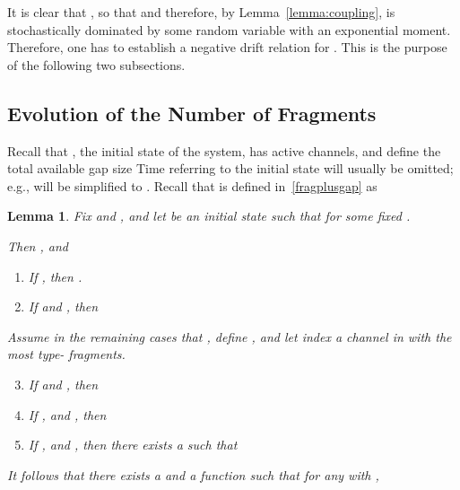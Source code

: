 \documentclass{amsart}
\newtheorem{lemma}{Lemma}
\begin{document}
It is clear that , so
that  and therefore, by Lemma~\ref{lemma:coupling},
 is stochastically dominated
by some random variable  with an exponential moment. Therefore,
one has to establish a negative drift relation for
. This is the purpose of
the following two subsections.
\subsection*{Evolution of the Number of Fragments}
Recall that  , the initial state of
the system, has  active channels, and define the total available gap size
  Time  referring to
the initial state   will usually be omitted; e.g.,  will be  simplified to .
Recall  that  is defined in~\eqref{fragplusgap} as 
\begin{lemma} \label{lemma:Delta}
Fix  and , and  let  be an initial state such that  for
some fixed .

Then ,
and\renewcommand{\labelenumi}{\arabic{enumi})}
\begin{enumerate}
    \item If , then .
\end{enumerate}

\begin{enumerate}\setcounter{enumi}{1}
    \item If  and , then

\end{enumerate}
Assume in the remaining cases that , define , and let  index a channel  in  with the most
type- fragments.
\begin{enumerate}\setcounter{enumi}{2}
        \item
If  and , then
        
        \item If ,  and ,
        then
        
        \item If ,  and , then there exists a  such that
        
    \end{enumerate}
    It follows that there exists a  and a function 
    such that for any  with ,
    
\end{lemma}
\end{document}
